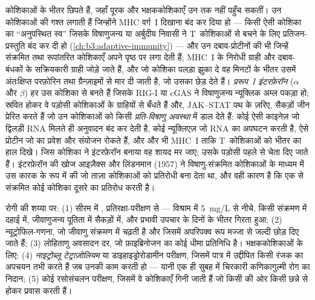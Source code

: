 \begin{definition}[प्राकृतिक घातक कोशिकाएँ और इंटरफ़ेरॉन]\label{def:b3:innate-immunity:nk-ifn}
 कोशिकाओं के भीतर छिपते हैं, जहाँ पूरक और भक्षककोशिकाएँ उन तक
नहीं पहुँच सकतीं। \emph{} उन कोशिकाओं की गश्त
लगाती हैं जिन्होंने MHC वर्ग~I दिखाना बंद कर दिया हो --- किसी ऐसी
कोशिका का ``अनुपस्थित स्व'' जिसके विषाणुजन्य या अर्बुदीय निवासी ने
T~कोशिकाओं से बचने के लिए प्रतिजन-प्रस्तुति बंद कर दी हो
(\cref{ch:b3:adaptive-immunity}) --- और उन दबाव-प्रोटीनों की भी जिन्हें
संक्रमित तथा रूपांतरित कोशिकाएँ अपने पृष्ठ पर लगा देती हैं; MHC~I के
निरोधी ग्राही और दबाव-बंधकों के सक्रियकारी ग्राही जोड़े जाते हैं, और
जो कोशिका पलड़ा झुका दे वह मिनटों के भीतर उसमें अंतःक्षिप्त परफ़ोरिन तथा
ग्रैन्ज़ाइमों से मार दी जाती है, जो उसका  छेड़ देते हैं।
\emph{प्ररूप~I इंटरफ़ेरॉन} ($\alpha$ और $\beta$) हर उस कोशिका से बनते
हैं जिसके RIG-I या cGAS ने विषाणुजन्य न्यूक्लिक अम्ल पकड़ा हो; स्रवित
होकर वे पड़ोसी कोशिकाओं के ग्राहियों से बँधते हैं और, JAK--STAT पथ के
ज़रिए, सैकड़ों जीन प्रेरित करते हैं जो उन कोशिकाओं को किसी
\emph{प्रति-विषाणु अवस्था} में डाल देते हैं: कोई ऐसी काइनेज़ जो द्विलड़ी
RNA मिलते ही अनुवादन बंद कर देती है, कोई न्यूक्लिएज़ जो RNA का अपघटन
करती है, ऐसे प्रोटीन जो  का प्रवेश और संयोजन रोकते हैं, और और भी
MHC~I ताकि T~कोशिकाओं को भीतर का हाल दिखे। जिस कोशिका ने इंटरफ़ेरॉन
बनाया वह शायद मर जाए; उसके पड़ोसी पहले से चेता दिए जाते हैं। इंटरफ़ेरॉन
की खोज आइज़ैक्स और लिंडनमान (1957) ने विषाणु-संक्रमित कोशिकाओं के माध्यम
में उस कारक के रूप में की जो ताज़ा कोशिकाओं को प्रतिरोधी बना देता था,
और वही कारण है कि एक  से संक्रमित कोई कोशिका दूसरे का प्रतिरोध
करती है।
\end{definition}

\begin{method}[शोथ और भक्षककोशिका-प्रकार्य नापना]\label{met:b3:innate-immunity:tests}
रोगी की शय्या पर: (1) सीरम में \emph{},
प्रतिरक्षा-परीक्षण से --- विश्राम में \qty{5}{mg/L} से नीचे, किसी
 संक्रमण में दहाई में, जीवाणुजन्य पूतिता में सैकड़ों में, और
प्रभावी उपचार के दिनों के भीतर गिरता हुआ; (2) न्यूट्रोफिल-गणना, जो
जीवाणु संक्रमण में चढ़ती है और जिसमें अपरिपक्व रूप मज्जा से जल्दी छोड़
दिए जाते हैं; (3) लोहिताणु अवसादन दर, जो फ़ाइब्रिनोजन का कोई धीमा
प्रतिनिधि है। भक्षककोशिकाओं के लिए: (4) \emph{नाइट्रोब्लू
टेट्राज़ोलियम} या डाइहाइड्रोरोडामीन परीक्षण, जिसमें पात्र में उद्दीपित
 किसी रंजक का अपचयन तभी करते हैं जब उनकी  काम
करती हो --- यानी एक ही सुबह में चिरकारी कणिकागुल्मी रोग का निदान;
(5) कोई रसोसंचलन परीक्षण, जिसमें वे कोशिकाएँ गिनी जाती हैं जो किसी
 की ओर किसी छन्ने से होकर प्रवास करती हैं।
\end{method}

